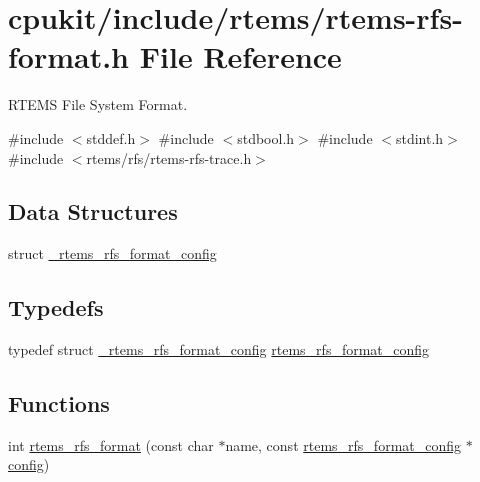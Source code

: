 \hypertarget{rtems-rfs-format_8h}{}\section{cpukit/include/rtems/rtems-\/rfs-\/format.h File Reference}
\label{rtems-rfs-format_8h}


R\+T\+E\+MS File System Format.  


{\ttfamily \#include $<$stddef.\+h$>$}\newline
{\ttfamily \#include $<$stdbool.\+h$>$}\newline
{\ttfamily \#include $<$stdint.\+h$>$}\newline
{\ttfamily \#include $<$rtems/rfs/rtems-\/rfs-\/trace.\+h$>$}\newline
\subsection*{Data Structures}
\begin{DoxyCompactItemize}
\item 
struct \mbox{\hyperlink{struct__rtems__rfs__format__config}{\+\_\+rtems\+\_\+rfs\+\_\+format\+\_\+config}}
\end{DoxyCompactItemize}
\subsection*{Typedefs}
\begin{DoxyCompactItemize}
\item 
typedef struct \mbox{\hyperlink{struct__rtems__rfs__format__config}{\+\_\+rtems\+\_\+rfs\+\_\+format\+\_\+config}} \mbox{\hyperlink{rtems-rfs-format_8h_a89d46e05dca9605cef445458620bb003}{rtems\+\_\+rfs\+\_\+format\+\_\+config}}
\end{DoxyCompactItemize}
\subsection*{Functions}
\begin{DoxyCompactItemize}
\item 
int \mbox{\hyperlink{rtems-rfs-format_8h_a56f021e1569663ecb2f46921a35e1a17}{rtems\+\_\+rfs\+\_\+format}} (const char $\ast$name, const \mbox{\hyperlink{rtems-rfs-format_8h_a89d46e05dca9605cef445458620bb003}{rtems\+\_\+rfs\+\_\+format\+\_\+config}} $\ast$\mbox{\hyperlink{structconfig__s}{config}})
\end{DoxyCompactItemize}


